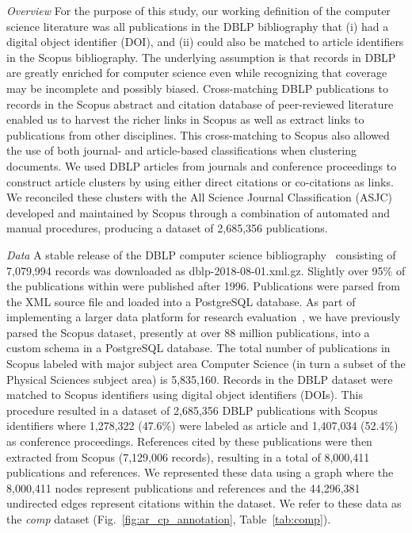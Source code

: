  \emph{Overview} For the purpose of this study, our working definition of the computer science literature was all publications in the DBLP bibliography that (i) had a digital object identifier (DOI), and (ii) could also be matched to article identifiers in the Scopus bibliography. The underlying assumption is that records in DBLP are greatly enriched for computer science even while recognizing that coverage may be incomplete and possibly biased. Cross-matching DBLP publications to records in the Scopus abstract and citation database of peer-reviewed literature enabled us to harvest the richer links in Scopus as well as extract links to publications from other disciplines. This cross-matching to Scopus also allowed the use of both journal- and article-based classifications when clustering documents. We used DBLP articles from journals and conference proceedings to construct article clusters by using either direct citations or co-citations as links. We reconciled these clusters with the All Science Journal Classification (ASJC) developed and maintained by Scopus through a combination of automated and manual procedures, producing a dataset of  2,685,356 publications.

\emph{Data} A stable release of the DBLP computer science bibliography~\cite{dblp_ref} consisting of 7,079,994 records was downloaded as dblp-2018-08-01.xml.gz. 
Slightly over 95\% of the publications within were published after 1996. 
Publications were parsed from the XML source file and loaded into a PostgreSQL database. As part of implementing a larger data platform for research evaluation~\cite{GithubERNIE2019}, we have previously parsed the Scopus dataset, presently at over 88 million publications, into a custom schema in a PostgreSQL database. 
The total number of publications in Scopus labeled with major subject area Computer Science (in turn a subset of the Physical Sciences subject area) is 5,835,160. Records in the DBLP dataset were matched to Scopus identifiers using digital object identifiers (DOIs). This procedure resulted in a dataset of 2,685,356 DBLP publications with Scopus identifiers where 1,278,322 (47.6\%) were labeled as article and 1,407,034 (52.4\%) as conference proceedings.  References cited by these publications were then extracted from Scopus (7,129,006 records), resulting in a total of 8,000,411 
publications and references. 
We represented these data using a graph where the 8,000,411 nodes represent
publications and references  and the 44,296,381 undirected edges represent citations within the dataset. 
We refer to these data as the  \emph{comp} dataset (Fig.~\ref{fig:ar_cp_annotation}, Table~\ref{tab:comp}).  
 
